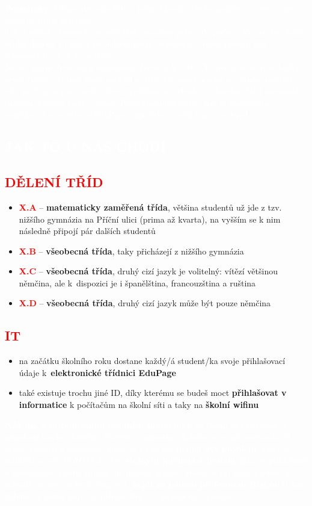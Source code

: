 \documentclass[a5paper, twoside]{article}
\newcommand{\boxik}[2]{
  \begin{tcolorbox}[
    sharp corners,
    colback = #1,
    boxrule = 0pt,
    grow to left by = 25pt,
    grow to right by = 25pt,
    right = 22pt,
    left = 22pt%
  ]
    #2
  \end{tcolorbox}
}
\newcommand{\nadpis}[4]{
  \vspace*{-50pt}
  \begin{tcolorbox}[colback = #2, boxrule = 0pt, grow to left by = #4,  grow to right by = #4, arc=8pt, height = 40pt]
    \vspace*{5pt}
    \centering \section*{\textcolor{#3}{#1}}
  \end{tcolorbox}
}
\newcommand{\podnadpis}[2]{
  \subsection*{\textcolor{#2}{#1}}
}
\begin{document}
  \vfill
  \noindent\textcolor{white}{\textbf{Poznámky.} Máme dvě schodiště – jedno hlavní a druhé požární (a třetí tajné, které na mapě nenajdeš).\\
  Jak si můžeš všimnout, na naší škole nemáme \textit{patra}, ale \textit{podlaží}. Ve zkratce: když vejdeš dveřmi z ulice, jsi v nultém patře (v přízemí -- tento přístup razí informatici), ale v 1. podlaží. \\
  Navíc, každé dveře mají svoje číslo. Třeba 4.A -- 310. To má svou určitou logiku: první číslice z trojice značí podlaží a další dvě značí polohu na daném podlaží tak, že 01 je nejvíc vzadu vlevo v pohledu od schodů a s každou další místností směrem doprava roste o jedna. Pokud nebudeš vědět, kde je jaká učebna, rozklikni si v rozvrhu v EduPage i její číslo a trefíš tam i poslepu!}
\newpage
{}

\nadpis{JAK TO U NÁS CHODÍ}{red}{white}{-3cm}
\noindent \podnadpis{DĚLENÍ TŘÍD}{red}
\begin{itemize}[leftmargin=10pt]
	\item \textcolor{red}{\textbf{X.A}} --  \textbf{matematicky zaměřená třída}, většina studentů už jde z tzv. nižšího gymnázia na Příční ulici (prima až kvarta), na vyšším se k nim následně připojí pár dalších studentů
	\item \textcolor{red}{\textbf{X.B}} -- \textbf{všeobecná třída}, taky přicházejí z nižšího gymnázia
	\item \textcolor{red}{\textbf{X.C}} -- \textbf{všeobecná třída}, druhý cizí jazyk je volitelný: vítězí většinou němčina, ale
	      k~dispozici je i španělština, francouzština a ruština
	\item \textcolor{red}{\textbf{X.D}} -- \textbf{všeobecná třída}, druhý cizí jazyk může být pouze němčina
\end{itemize}

\podnadpis{IT}{red}
\begin{itemize}[leftmargin=10pt]
	\item na začátku školního roku dostane každý/á student/ka svoje přihlašovací údaje k~\textbf{elektronické třídnici EduPage}
	\item také existuje trochu jiné ID, díky kterému se budeš moct \textbf{přihlašovat v informatice} k počítačům na školní síti a taky na \textbf{školní wifinu}
\end{itemize}

\smallskip
\boxik{red}{\textcolor{white}{
  \textbf{Náš tip.} S \textbf{připojováním osobních notebooků} na školní wifi to bývalo v minulosti trochu složitější. Naštěstí v minulém školním roce naše zastaralá síť přošla značnými úpravami, takže už by to teď \textbf{neměl být problém}. Stačí se přihlásit na síť \textit{JAROSKA\_S} se \textbf{stejným jménem a heslem}, jako se přihlašuješ v informatice. Pokud si heslo na počítač změníš, změní se ti i heslo na wifi! V případě, že něco nebude fungovat, \textbf{zajdi za panem profesorem Blahou} (jehož kabinet si můžeš najít na plánku školy) a~popros ho o pomoc.}
}
\end{document}
